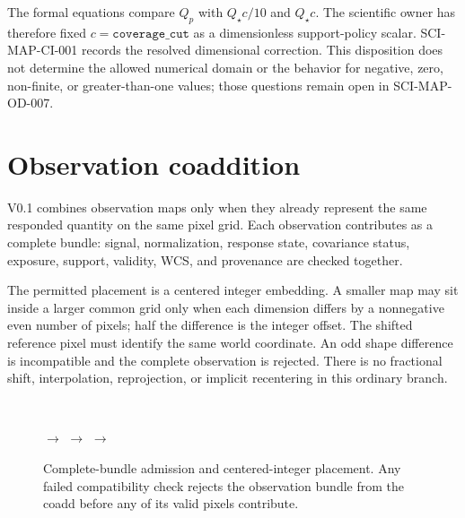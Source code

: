 \documentclass[10pt]{article}
\begin{document}
The formal equations compare \(Q_p\) with \(Q_\star c/10\) and \(Q_\star c\).
The scientific owner has therefore fixed
\(c=\texttt{coverage\_cut}\) as a dimensionless support-policy scalar.
SCI-MAP-CI-001 records the resolved dimensional correction. This disposition
does not determine the allowed numerical domain or the behavior for negative,
zero, non-finite, or greater-than-one values; those questions remain open in
SCI-MAP-OD-007.

\clearpage
\section{Observation coaddition}\label{sec:coadd}
V0.1 combines observation maps only when they already represent the same
responded quantity on the same pixel grid. Each observation contributes as a
complete bundle: signal, normalization, response state, covariance status,
exposure, support, validity, WCS, and provenance are checked together.

The permitted placement is a centered integer embedding. A smaller map may
sit inside a larger common grid only when each dimension differs by a
nonnegative even number of pixels; half the difference is the integer offset.
The shifted reference pixel must identify the same world coordinate. An odd
shape difference is incompatible and the complete observation is rejected.
There is no fractional shift, interpolation, reprojection, or implicit
recentering in this ordinary branch.

\begin{figure}[h]
\centering
\begin{minipage}[c]{0.18\linewidth}\centering
{}\\[0.22em]
\end{minipage}
\hfill\(\longrightarrow\)\hfill
{}
\hfill\(\longrightarrow\)\hfill
{}
\hfill\(\longrightarrow\)\hfill
{}
\caption{Complete-bundle admission and centered-integer placement. Any failed compatibility check rejects the observation bundle from the coadd before any of its valid pixels contribute.}
\label{fig:coadd}
\end{figure}
\end{document}
